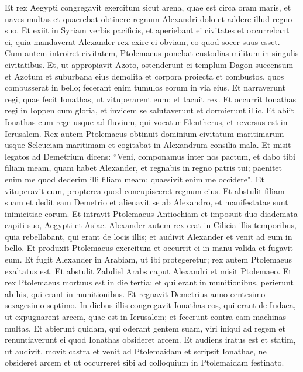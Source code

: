 \begin{biblechapter}  
\verse Et rex Aegypti congregavit exercitum sicut arena, quae est circa oram maris, et naves multas et quaerebat obtinere regnum Alexandri dolo et addere illud regno suo. 
\verse Et exiit in Syriam verbis pacificis, et aperiebant ei civitates et occurrebant ei, quia mandaverat Alexander rex exire ei obviam, eo quod socer suus esset. 
\verse Cum autem introiret civitatem, Ptolemaeus ponebat custodias militum in singulis civitatibus. 
\verse Et, ut appropiavit Azoto, ostenderunt ei templum Dagon succensum et Azotum et suburbana eius demolita et corpora proiecta et combustos, quos combusserat in bello; fecerant enim tumulos eorum in via eius. 
\verse Et narraverunt regi, quae fecit Ionathas, ut vituperarent eum; et tacuit rex. 
\verse Et occurrit Ionathas regi in Ioppen cum gloria, et invicem se salutaverunt et dormierunt illic. 
\verse Et abiit Ionathas cum rege usque ad fluvium, qui vocatur Eleutherus, et reversus est in Ierusalem.  
\verse Rex autem Ptolemaeus obtinuit dominium civitatum maritimarum usque Seleuciam maritimam et cogitabat in Alexandrum consilia mala. 
\verse Et misit legatos ad Demetrium dicens: “Veni, componamus inter nos pactum, et dabo tibi filiam meam, quam habet Alexander, et regnabis in regno patris tui; 
\verse paenitet enim me quod dederim illi filiam meam: quaesivit enim me occidere". 
\verse Et vituperavit eum, propterea quod concupisceret regnum eius. 
\verse Et abstulit filiam suam et dedit eam Demetrio et alienavit se ab Alexandro, et manifestatae sunt inimicitiae eorum. 
\verse Et intravit Ptolemaeus Antiochiam et imposuit duo diademata capiti suo, Aegypti et Asiae. 
\verse Alexander autem rex erat in Cilicia illis temporibus, quia rebellabant, qui erant de locis illis; 
\verse et audivit Alexander et venit ad eum in bello. Et produxit Ptolemaeus exercitum et occurrit ei in manu valida et fugavit eum. 
\verse Et fugit Alexander in Arabiam, ut ibi protegeretur; rex autem Ptolemaeus exaltatus est. 
\verse Et abstulit Zabdiel Arabs caput Alexandri et misit Ptolemaeo. 
\verse Et rex Ptolemaeus mortuus est in die tertia; et qui erant in munitionibus, perierunt ab his, qui erant in munitionibus. 
\verse Et regnavit Demetrius anno centesimo sexagesimo septimo. 
\verse In diebus illis congregavit Ionathas eos, qui erant de Iudaea, ut expugnarent arcem, quae est in Ierusalem; et fecerunt contra eam machinas multas. 
\verse Et abierunt quidam, qui oderant gentem suam, viri iniqui ad regem et renuntiaverunt ei quod Ionathas obsideret arcem. 
\verse Et audiens iratus est et statim, ut audivit, movit castra et venit ad Ptolemaidam et scripsit Ionathae, ne obsideret arcem et ut occurreret sibi ad colloquium in Ptolemaidam festinato. 

\end{biblechapter}
